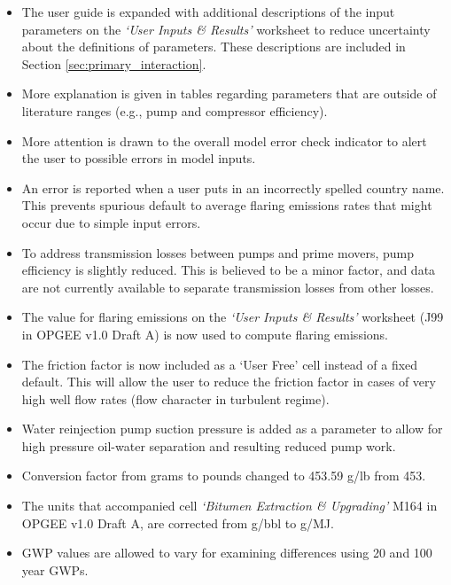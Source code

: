 \documentclass[11pt]{report}
\newcommand{\sheet}[1]{\textit{`{#1}'}}
\begin{document}
\begin{itemize}

\item The user guide is expanded with additional descriptions of the input parameters on the \sheet{User Inputs \& Results} worksheet to reduce uncertainty about the definitions of parameters. These descriptions are included in Section \ref{sec:primary_interaction}.

\item More explanation is given in tables regarding parameters that are outside of literature ranges (e.g., pump and compressor efficiency).

\item More attention is drawn to the overall model error check indicator to alert the user to possible errors in model inputs.

\item An error is reported when a user puts in an incorrectly spelled country name. This prevents spurious default to average flaring emissions rates that might occur due to simple input errors.

\item To address transmission losses between pumps and prime movers, pump efficiency is slightly reduced. This is believed to be a minor factor, and data are not currently available to separate transmission losses from other losses.

\item The value for flaring emissions on the \sheet{User Inputs \& Results} worksheet (J99 in OPGEE v1.0 Draft A) is now used to compute flaring emissions.

\item The friction factor is now included as a `User Free' cell instead of a fixed default. This will allow the user to reduce the friction factor in cases of very high well flow rates (flow character in turbulent regime).

\item Water reinjection pump suction pressure is added as a parameter to allow for high pressure oil-water separation and resulting reduced pump work. 

\item Conversion factor from grams to pounds changed to 453.59 g/lb from 453.

\item The units that accompanied cell \sheet{Bitumen Extraction \& Upgrading} M164 in OPGEE v1.0 Draft A, are corrected from g/bbl to g/MJ.

\item GWP values are allowed to vary for examining differences using 20 and 100 year GWPs.

\end{itemize}







\begin{small}

\makeatletter
\renewcommand\@biblabel[1]{#1. }
\makeatother

\end{small}
\end{document}
